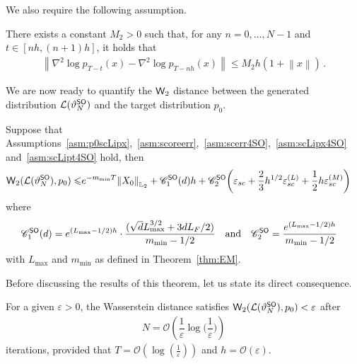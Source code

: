 \documentclass[11pt]{article}
\def\Ltwo{\mathbb L_2}
\def\wass{{\sf W}}
\def\law{{\mathcal L}}
\def\l|{\left\lVert}
\def\r|{\right\rVert}
\begin{document}
We also require the following assumption.
\begin{assumption}
    \label{asm:scLipt4SO}
    There exists a constant $M_2>0$ such that, for any $n=0,\dots,N-1$ and $t\in[nh,(n+1)h]$, it holds that
    \begin{align*}
        \l|\nabla^2\log p_{T-t}(x)-\nabla^2\log p_{T-nh}(x)\r|\leqslant M_2h(1+\l|x\r|)\,.
    \end{align*}
\end{assumption}
We are now ready to quantify the $\wass_2$ distance between the generated distribution $\law(\vartheta_N^{\sf SO})$ and the target distribution $p_0$.
\begin{theorem}
    \label{thm:2order}
    Suppose that Assumptions~\ref{asm:p0scLipx},~\ref{asm:scoreerr},~\ref{asm:scerr4SO},~\ref{asm:scLipx4SO} and~\ref{asm:scLipt4SO} hold, then
    \begin{align*}
        \wass_2(\law(\vartheta_N^{\sf SO}),p_0)
        \leqslant& e^{-m_{\min}T}\l|X_0\r|_{\Ltwo}+\mathscr C_1^{\sf SO}(d)h+\mathscr C_2^{\sf SO}\left(\varepsilon_{sc}+\dfrac{2}{3}h^{1/2}\varepsilon_{sc}^{(L)}+\dfrac{1}{2}h\varepsilon_{sc}^{(M)}\right)
    \end{align*}
    where 
    \begin{align*}
    \mathscr C_1^{\sf SO}(d)&=e^{(L_{\max}-1/2)h}\cdot\dfrac{(\sqrt{d}L_{\max}^{3/2}+3dL_F/2)}{m_{\min}-1/2}~~\text{ and }~~
    \mathscr C_2^{\sf SO}=\dfrac{e^{(L_{\max}-1/2)h}}{m_{\min}-1/2}
    \end{align*}
    with $L_{\max}$ and $m_{\min}$ as defined in Theorem~\ref{thm:EM}.
\end{theorem}
Before discussing the results of this theorem, let us state its direct consequence.
\begin{corollary}
    For a given $\varepsilon>0$, the Wasserstein distance satisfies $\wass_2(\law(\vartheta_N^{\sf SO}),p_0)<\varepsilon$ after
    \begin{align*}
        N=\mathcal{O}\left(\dfrac{1}{\varepsilon}\log\Big(\dfrac{1}{\varepsilon}\Big)\right)
    \end{align*}
    iterations, provided that $T=\mathcal{O}\left(\log(\frac{1}{\varepsilon})\right)$ and $h=\mathcal{O}(\varepsilon)$.
\end{corollary}
\end{document}
